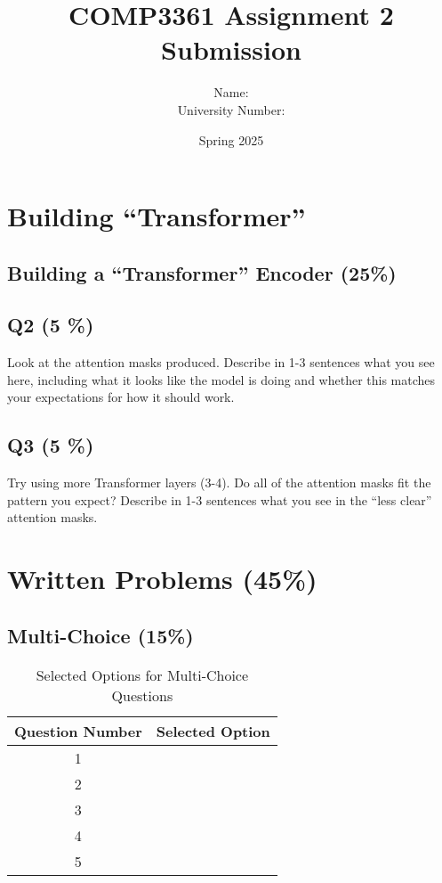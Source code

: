 \documentclass[10pt]{article}
\begin{document}

\title{COMP3361 Assignment 2 Submission}
\author{Name: \\ University Number:}
\date{Spring 2025}
\maketitle

\section{Building ``Transformer''}


\subsection{Building a ``Transformer'' Encoder (25\%)} 

\subsection{Q2 (5 \%)} Look at the attention masks produced. Describe in 1-3 sentences what you see here, including what it looks like the model is doing and whether this matches your expectations for how it should work.

\subsection{Q3 (5 \%)} Try using more Transformer layers (3-4). Do all of the attention masks fit the pattern you expect? Describe in 1-3 sentences what you see in the ``less clear'' attention masks.

\section{Written Problems (45\%)}

\subsection{Multi-Choice (15\%)}

\begin{table}[htbp]
\centering
\begin{tabular}{@{}cc@{}}
\toprule
Question Number & Selected Option \\ \midrule
1               &              \\
2               &              \\
3               &              \\
4               &              \\
5               &              \\
\bottomrule
\end{tabular}
\caption{Selected Options for Multi-Choice Questions}
\label{tab:my_label}
\end{table}
\end{document}
